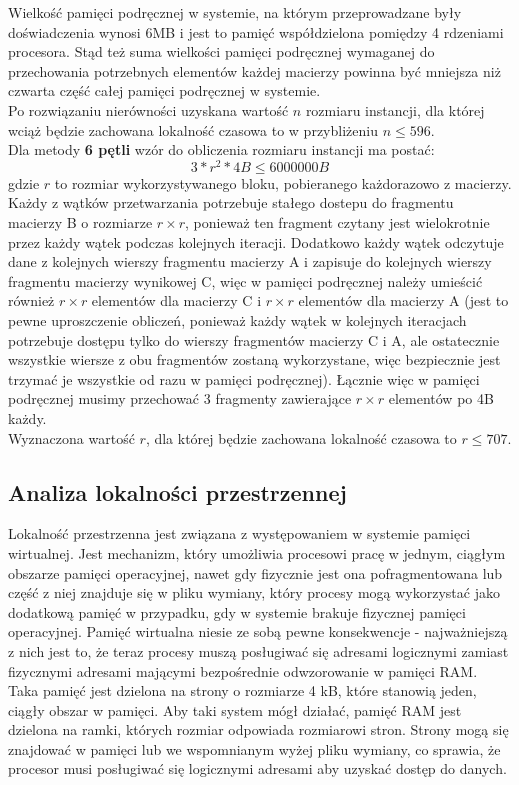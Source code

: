 \documentclass[10pt,a4paper]{article}
\begin{document}
Wielkość pamięci podręcznej w systemie, na którym przeprowadzane były doświadczenia wynosi 6MB i 
jest to pamięć współdzielona pomiędzy 4 rdzeniami procesora. Stąd też suma wielkości pamięci podręcznej 
wymaganej do przechowania potrzebnych elementów każdej macierzy powinna być mniejsza niż czwarta 
część całej pamięci podręcznej w systemie.\\
Po rozwiązaniu nierówności uzyskana wartość $n$ rozmiaru instancji, dla której wciąż będzie zachowana
lokalność czasowa to w przybliżeniu $n \leq 596$.\\

Dla metody \textbf{6 pętli} wzór do obliczenia rozmiaru instancji ma postać:
\begin{equation}
	3*r^2 * 4B \leq 6000000B
\end{equation}
gdzie $r$ to rozmiar wykorzystywanego bloku, pobieranego każdorazowo z macierzy.\\

Każdy z wątków przetwarzania potrzebuje stałego dostepu do fragmentu macierzy B o rozmiarze $r \times r$, ponieważ
ten fragment czytany jest wielokrotnie przez każdy wątek podczas kolejnych iteracji. Dodatkowo każdy wątek odczytuje 
dane z kolejnych wierszy fragmentu macierzy A i zapisuje do kolejnych wierszy fragmentu macierzy wynikowej C, 
więc w pamięci podręcznej należy umieścić również $r \times r$ elementów dla macierzy C i $r \times r$ elementów 
dla macierzy A (jest to pewne uproszczenie obliczeń, ponieważ każdy wątek w kolejnych iteracjach potrzebuje 
dostępu tylko do wierszy fragmentów macierzy C i A, ale ostatecznie wszystkie wiersze z obu fragmentów zostaną
wykorzystane, więc bezpiecznie jest trzymać je wszystkie od razu w pamięci podręcznej). Łącznie więc w pamięci 
podręcznej musimy przechować 3 fragmenty zawierające $r \times r$ elementów po 4B każdy.\\

Wyznaczona wartość $r$, dla której będzie zachowana lokalność czasowa to $r \leq 707$.

\subsection{Analiza lokalności przestrzennej}
Lokalność przestrzenna jest związana z występowaniem w systemie pamięci wirtualnej.
Jest mechanizm, który umożliwia procesowi pracę w jednym, ciągłym obszarze pamięci operacyjnej,
nawet gdy fizycznie jest ona pofragmentowana lub część z niej znajduje się w pliku wymiany,
który procesy mogą wykorzystać jako dodatkową pamięć w przypadku, gdy w systemie brakuje
fizycznej pamięci operacyjnej. Pamięć wirtualna niesie ze sobą pewne konsekwencje -
najważniejszą z nich jest to, że teraz procesy muszą posługiwać się adresami logicznymi
zamiast fizycznymi adresami mającymi bezpośrednie odwzorowanie w pamięci RAM.
Taka pamięć jest dzielona na strony o rozmiarze 4 kB, które stanowią jeden, ciągły obszar w pamięci.
Aby taki system mógł działać, pamięć RAM jest dzielona na ramki, których rozmiar odpowiada
rozmiarowi stron. Strony mogą się znajdować w pamięci lub we wspomnianym wyżej pliku wymiany,
co sprawia, że procesor musi posługiwać się logicznymi adresami aby uzyskać dostęp do danych.\\
\end{document}
